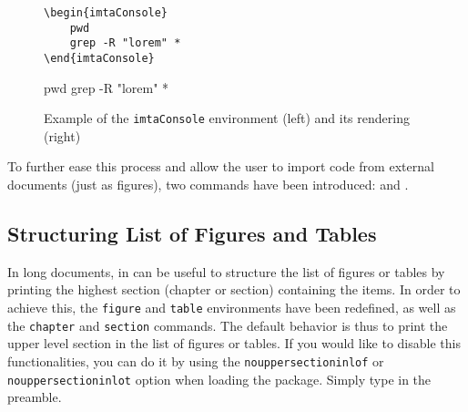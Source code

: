 \documentclass{report}
\begin{document}
\begin{figure}[!ht]
\begin{minipage}{.45\linewidth}
\renewcommand{\theFancyVerbLine}{\texttt{\textcolor{gray!150}{\normalsize \oldstylenums{\arabic{FancyVerbLine}}}}}%
\vspace{0.5\baselineskip}%
\begin{mdframed}[backgroundcolor=imtaCodeLinenosFrame, innerrightmargin=0pt, innertopmargin=0pt, innerbottommargin=0pt, linewidth=1pt]
\begin{mdframed}[backgroundcolor=imtaCodeBackground, skipabove=0pt, skipbelow=0pt, rightmargin=0pt, leftmargin=3ex, linewidth=0pt, innertopmargin=5pt, innerbottommargin=5pt, innerleftmargin=1ex]%
\begin{verbatim}
\begin{imtaConsole}
    pwd
    grep -R "lorem" *
\end{imtaConsole}
\end{verbatim}
\end{mdframed}
\end{mdframed}
\end{minipage}
\hfill
\begin{minipage}{.45\linewidth}
\vspace{2em}
\begin{imtaConsole}
pwd
grep -R "lorem" *
\end{imtaConsole}
\end{minipage}
\caption{Example of the \texttt{imtaConsole} environment (left) and its rendering (right)\label{fig:imtaCode}}
\end{figure}

To further ease this process and allow the user to import code from external documents (just as figures), two commands have been introduced:  and .



\subsection{Structuring List of Figures and Tables}
In long documents, in can be useful to structure the list of figures or tables by printing the highest section (chapter or section) containing the items. In order to achieve this, the \texttt{figure} and \texttt{table} environments have been redefined, as well as the \texttt{chapter} and \texttt{section} commands. The default behavior is thus to print the upper level section in the list of figures or tables. If you would like to disable this functionalities, you can do it by using the \texttt{nouppersectioninlof} or \texttt{nouppersectioninlot} option when loading the package. Simply type  in the preamble.
\end{document}

